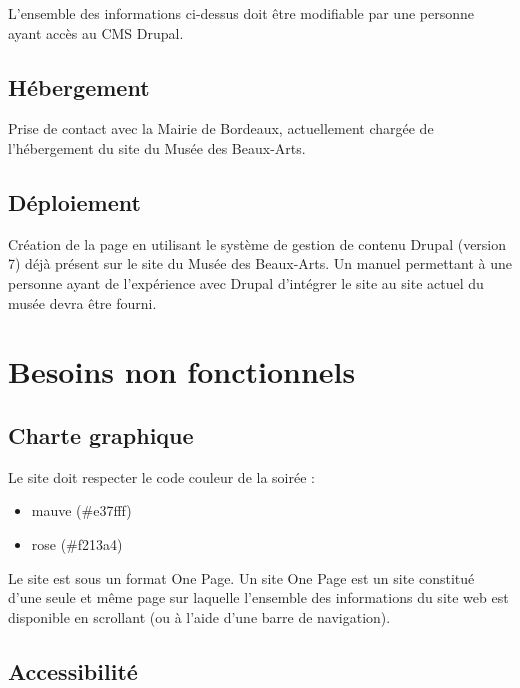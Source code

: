 \documentclass[11pt]{report}
\begin{document}
L'ensemble des informations ci-dessus doit être modifiable par une personne
ayant accès au CMS Drupal. \\


\subsection*{Hébergement}
Prise de contact avec la Mairie de Bordeaux, actuellement chargée de
l'hébergement du site du Musée des Beaux-Arts.

\subsection*{Déploiement}
Création de la page en utilisant le système de gestion de contenu Drupal
(version 7) déjà présent sur le site du Musée des Beaux-Arts.
Un manuel permettant à une personne ayant de l'expérience avec Drupal
d'intégrer le site au site actuel du musée devra être fourni.


\newpage

\section{Besoins non fonctionnels}

\subsection*{Charte graphique}

Le site doit respecter le code couleur de la soirée :
\begin{itemize}
	\item mauve (\#e37fff)
	\item rose  (\#f213a4)
\end{itemize}

Le site est sous un format One Page. Un site One Page est un site constitué
d'une seule et même page sur laquelle l'ensemble des informations du site web
est disponible en scrollant (ou à l'aide d'une barre de navigation).

\subsection*{Accessibilité}
\end{document}
